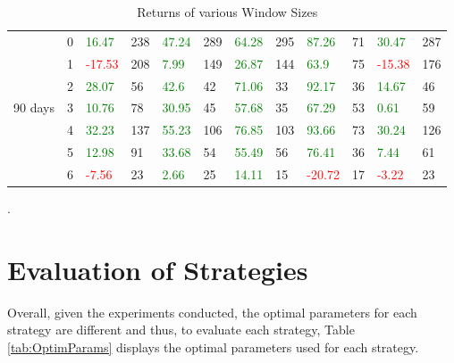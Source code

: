 \begin{table}[!htb]
\begin{adjustwidth}{-0.8in}{-0.9in}
\begin{tabular}{|p{4em}|p{2em}|p{3em}|p{3em}|p{3em}|p{3em}|p{3em}|p{3em}|p{3em}|p{3em}|p{3em}|p{3em}|}
            & 0 & \textcolor{green}{16.47} & 238 & \textcolor{green}{47.24} & 289 & \textcolor{green}{64.28} & 295 & \textcolor{green}{87.26} & 71 & \textcolor{green}{30.47} & 287\\\cline{3-12}
            & 1 & \textcolor{red}{-17.53} & 208 & \textcolor{green}{7.99} & 149 & \textcolor{green}{26.87} & 144 & \textcolor{green}{63.9} & 75 & \textcolor{red}{-15.38} & 176\\\cline{3-12}
            & 2 & \textcolor{green}{28.07} & 56 & \textcolor{green}{42.6} & 42 & \textcolor{green}{71.06} & 33 & \textcolor{green}{92.17} & 36 & \textcolor{green}{14.67} & 46\\\cline{3-12}
            90 days & 3 & \textcolor{green}{10.76} & 78 & \textcolor{green}{30.95} & 45 & \textcolor{green}{57.68} & 35 & \textcolor{green}{67.29} & 53 & \textcolor{green}{0.61} & 59\\\cline{3-12}
            & 4 & \textcolor{green}{32.23} & 137 & \textcolor{green}{55.23} & 106 & \textcolor{green}{76.85} & 103 & \textcolor{green}{93.66} & 73 & \textcolor{green}{30.24} & 126\\\cline{3-12}
            & 5 & \textcolor{green}{12.98} & 91 & \textcolor{green}{33.68} & 54 & \textcolor{green}{55.49} & 56 & \textcolor{green}{76.41} & 36 & \textcolor{green}{7.44} & 61\\\cline{3-12}
            & 6 & \textcolor{red}{-7.56} & 23 & \textcolor{green}{2.66} & 25 & \textcolor{green}{14.11} & 15 & \textcolor{red}{-20.72} & 17 & \textcolor{red}{-3.22} & 23\\\hline
            
        \end{tabular}
    \end{adjustwidth}
    \caption{Returns of various Window Sizes \label{tab:VaryWS}}.
\end{table}


\section{Evaluation of Strategies}
Overall, given the experiments conducted, the optimal parameters for each strategy are different and thus, to evaluate each strategy, Table \ref{tab:OptimParams} displays the optimal parameters used for each strategy.

